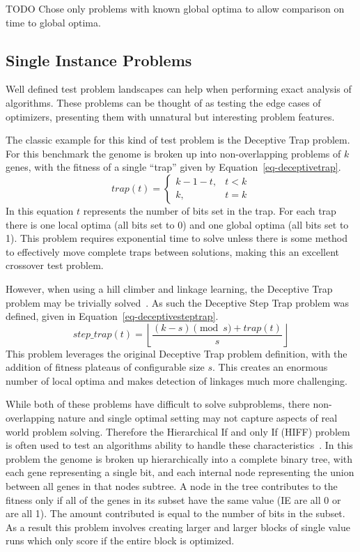 \documentclass{sig-alternate}
\begin{document}
TODO Chose only problems with known global optima to allow comparison on time to
global optima.

\subsection{Single Instance Problems}
Well defined test problem landscapes can help when performing exact analysis of
algorithms.  These problems can be thought of as testing the edge cases of optimizers,
presenting them with unnatural but interesting problem features.

The classic example for this kind of test problem is the Deceptive Trap problem.
For this benchmark the genome is broken up into non-overlapping problems of $k$
genes, with the fitness of a single ``trap'' given by Equation~\ref{eq-deceptivetrap}.
\begin{equation}
   trap(t) = \left\{
     \begin{array}{rl}
       k-1-t, &  t<k\\
       k,   &  t = k
     \end{array}
   \right.
  \label{eq-deceptivetrap}
\end{equation}
In this equation $t$ represents the number of bits set in the trap.  For each trap
there is one local optima (all bits set to 0) and one global optima (all bits set to 1).
This problem requires exponential time to solve unless there is some method to effectively
move complete traps between solutions, making this an excellent crossover test problem.

However, when using a hill climber and linkage learning, the Deceptive Trap problem
may be trivially solved~\cite{goldman:2012:ltga}.  As such the Deceptive Step Trap
problem was defined, given in Equation~\ref{eq-deceptivesteptrap}.
\begin{equation}
   step\_trap(t) = \left \lfloor \frac{(k-s)\pmod{s} + trap(t)}{s} \right \rfloor
  \label{eq-deceptivesteptrap}
\end{equation}
This problem leverages the original Deceptive Trap problem definition, with the
addition of fitness plateaus of configurable size $s$.  This creates an enormous
number of local optima and makes detection of linkages much more challenging.

While both of these problems have difficult to solve subproblems, there non-overlapping
nature and single optimal setting may not capture aspects of real world problem solving.
Therefore the Hierarchical If and only If (HIFF) problem is often used to test an
algorithms ability to handle these characteristics~\cite{thierens:2013:ltgahiff}.
In this problem the genome is broken up hierarchically into a complete binary tree,
with each gene representing a single bit, and each internal node representing the union
between all genes in that nodes subtree.  A node in the tree contributes to the fitness
only if all of the genes in its subset have the same value (IE are all 0 or are all 1).
The amount contributed is equal to the number of bits in the subset.  As a result
this problem involves creating larger and larger blocks of single value runs which
only score if the entire block is optimized.
\end{document}

